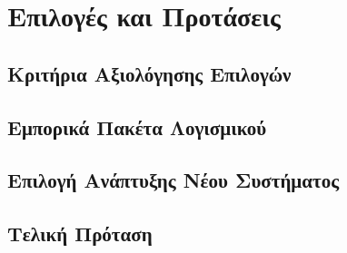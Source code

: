 \chapter{Επιλογές και Προτάσεις}

\section{Κριτήρια Αξιολόγησης Επιλογών}
\section{Εμπορικά Πακέτα Λογισμικού}
\section{Επιλογή Ανάπτυξης Νέου Συστήματος}
\section{Τελική Πρόταση}

